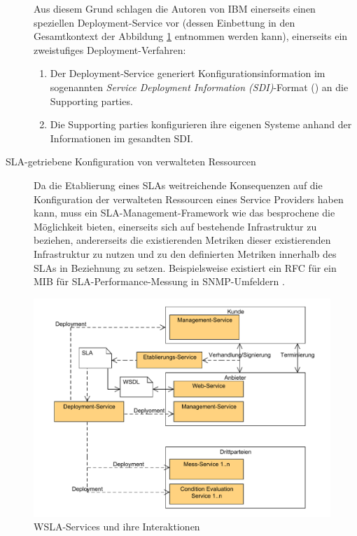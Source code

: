 \documentclass[11pt,listof=totoc]{scrreprt} %
\theoremstyle{definition}
\begin{document}
\begin{description}
Aus diesem Grund schlagen die Autoren von IBM einerseits einen speziellen Deploy\-ment-Service vor (dessen Einbettung in den Gesamtkontext der Abbildung \ref{wslacontext} entnommen werden kann), einerseits ein zweistufiges Deployment-Verfahren:
\begin{enumerate}
\item Der Deployment-Service generiert Konfigurationsinformation im sogenannten {\em Service Deployment Information (SDI)}-Format (\cite{ibm:wslaPaper, ibm:wslaSpec}) an die Supporting parties.
\item Die Supporting parties konfigurieren ihre eigenen Systeme anhand der Informationen im gesandten SDI.
\end{enumerate}
\item[SLA-getriebene Konfiguration von verwalteten Ressourcen]
Da die Etablierung eines SLAs weitreichende Konsequenzen auf die Konfiguration der verwalteten Ressourcen eines Service Providers haben kann, muss ein SLA-Management-Framework wie das besprochene die Möglichkeit bieten, einerseits sich auf bestehende Infrastruktur zu beziehen, andererseits die existierenden Metriken dieser existierenden Infrastruktur zu nutzen und zu den definierten Metriken innerhalb des SLAs in Beziehnung zu setzen. Beispielsweise existiert ein RFC für ein MIB für SLA-Performance-Messung in SNMP-Umfeldern \cite{ibm:wslaPaper, rfc2758}.
\end{description}

\begin{figure}
\caption{WSLA-Services und ihre Interaktionen}
\label{wslacontext}
\includegraphics[scale=0.7]{diagramme/wsla_context.pdf}
\end{figure}
\end{document}
